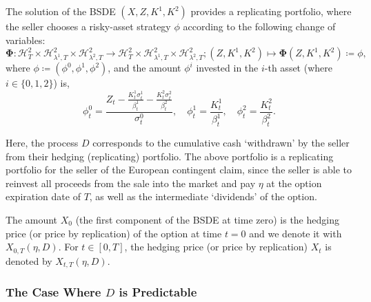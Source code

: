 \documentclass[11pt,a4paper]{article}
\numberwithin{equation}{section}
\theoremstyle{newPlain}
\theoremstyle{newDefinition}
\theoremstyle{newRemark}
\begin{document}
The solution of the BSDE $(X,Z,K^1,K^2)$ provides a replicating portfolio, where the seller chooses a risky-asset strategy $\phi$ according to the following change of variables: %
\begin{equation}\label{eq:3_LinearStrategy}
    \mathbf{\Phi}:\mathcal{H}_T^2\times\mathcal{H}_{\lambda^1,T}^2\times\mathcal{H}_{\lambda^2,T}^2\rightarrow\mathcal{H}_T^2\times\mathcal{H}_{\lambda^1,T}^2\times\mathcal{H}_{\lambda^2,T}^2; (Z,K^1, K^2)\mapsto\mathbf{\Phi}(Z,K^1,K^2)\coloneqq\phi,
\end{equation}
where $\phi\coloneqq(\phi^0,\phi^1,\phi^2)$, and the amount $\phi^i$ invested in the $i$-th asset (where $i\in\{0,1,2\}$) is,
\begin{equation}\label{eq:3_VarChange}
    \phi_t^0 = \frac{Z_t-\frac{K_t^1\sigma_t^1}{\beta_t^1}-\frac{K_t^2\sigma_t^2}{\beta_t^2}}{\sigma_t^0},\quad\phi_t^1=\frac{K_t^1}{\beta_t^1},\quad\phi_t^2=\frac{K_t^2}{\beta_t^2}.
\end{equation}

Here, the process $D$ corresponds to the cumulative cash `withdrawn' by the seller from their hedging (replicating) portfolio. The above portfolio is a replicating portfolio for the seller of the European contingent claim, since the seller is able to reinvest all proceeds from the sale into the market and pay $\eta$ at the option expiration date of $T$, as well as the intermediate `dividends' of the option.

The amount $X_0$ (the first component of the BSDE  at time zero) is the hedging price (or price by replication) of the option at time $t=0$ and we denote it with $X_{0,T}(\eta, D)$. For $t\in[0,T]$, the hedging price (or price by replication) $X_t$ is denoted by $X_{t,T}(\eta, D)$.

\subsubsection{The Case Where $D$ is Predictable}
\end{document}
